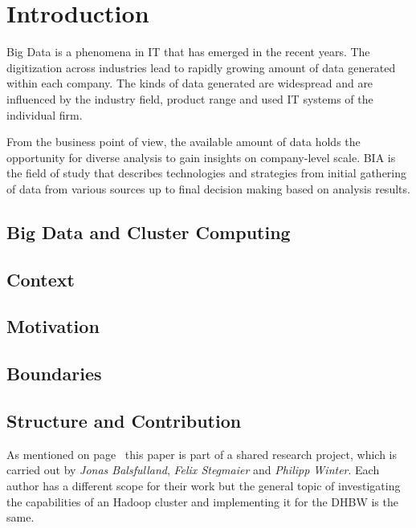 \chapter{Introduction}

Big Data is a phenomena in \ac{IT} that has emerged in the recent years.
The digitization across industries lead to rapidly growing amount of data generated
within each company.
The kinds of data generated are widespread 
and are influenced by the industry field, product range and used \ac{IT} systems 
of the individual firm.

From the business point of view, the available amount of data 
holds the opportunity for diverse analysis to gain insights on company-level scale.
\ac{BIA} is the field of study that describes technologies and strategies 
from initial gathering of data from various sources 
up to final decision making based on analysis results.    

\section{Big Data and Cluster Computing}


\section{Context}

\section{Motivation}

\section{Boundaries}

\section{Structure and Contribution}
\label{intro:structure}


As mentioned on page~\pageref{prenotes} this paper is part of a shared research project,
which is carried out by \textit{Jonas Balsfulland}, \textit{Felix Stegmaier} and \textit{Philipp Winter}.
Each author has a different scope for their work but the general topic of investigating the capabilities of an Hadoop cluster and implementing it for the \ac{DHBW} is the same.

